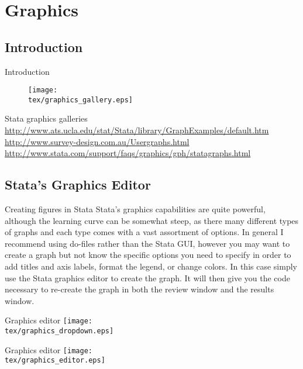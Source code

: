 \documentclass[fleqn, handout, 10pt]{beamer}
\def\tex{S:/trainings/stata/tex}
\begin{document}
\section{Graphics}

\subsection{Introduction}
\begin{frame}{Introduction}

    \begin{figure}
	\centering
	\texttt{[image: \\tex/graphics\_gallery.eps]}
    \end{figure}

    \begin{block}{Stata graphics galleries}
	{\footnotesize
	\url{http://www.ats.ucla.edu/stat/Stata/library/GraphExamples/default.htm}
	\url{http://www.survey-design.com.au/Usergraphs.html}
	\url{http://www.stata.com/support/faqs/graphics/gph/statagraphs.html}
	}
    \end{block}
\end{frame}

\subsection{Stata's Graphics Editor}

\begin{frame}{Creating figures in Stata}
    Stata's graphics capabilities are quite powerful, although the learning curve can be somewhat steep, as there many different types of graphs and each type comes with a vast assortment of options. In general I recommend using do-files rather than the Stata GUI, however you may want to create a graph but not know the specific options you need to specify in order to add titles and axis labels, format the legend, or change colors. In this case simply use the Stata graphics editor to create the graph. It will then give you the code necessary to re-create the graph in both the review window and the results window.
\end{frame}

\begin{frame}{Graphics editor}
    \texttt{[image: \\tex/graphics\_dropdown.eps]}
\end{frame}

\begin{frame}{Graphics editor}
    \texttt{[image: \\tex/graphics\_editor.eps]}
\end{frame}
\end{document}

